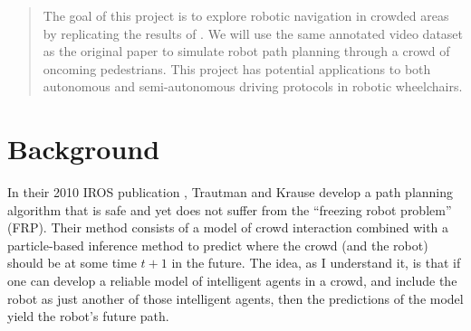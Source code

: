 \documentclass[a4paper,11pt,headings=small]{article}
\begin{document}


\pagestyle{fancy}
\fancyhf{}

\setcounter{page}{1}

\renewcommand{\thesection}{\Roman{section}}
\thispagestyle{empty}

\newcommand{\f}{\mathbf{f}}
\newcommand{\fr}{\f^{(R)}}
\newcommand{\fati}{\f^{(i)}}
\newcommand{\fatj}{\f^{(j)}}
\newcommand{\samplej}{(\fatj)_i}
\newcommand{\z}{\mathbf{z}}
\newcommand{\ztot}{\z_{1:t}}

\begin{abstract}
The goal of this project is to explore robotic navigation in crowded areas by replicating the results of \cite{Trautman2010}. We will use the same annotated video dataset as the original paper to simulate robot path planning through a crowd of oncoming pedestrians. This project has potential applications to both autonomous and semi-autonomous driving protocols in robotic wheelchairs.
\end{abstract}


\section*{Background}
\quad In their 2010 IROS publication \cite{Trautman2010}, Trautman and Krause develop a path planning algorithm that is safe and yet does not suffer from the ``freezing robot problem'' (FRP). Their method consists of a model of crowd interaction combined with a particle-based inference method to predict where the crowd (and the robot) should be at some time $t+1$ in the future. The idea, as I understand it, is that if one can develop a reliable model of intelligent agents in a crowd, and include the robot as just another of those intelligent agents, then the predictions of the model yield the robot's future path.
\end{document}
